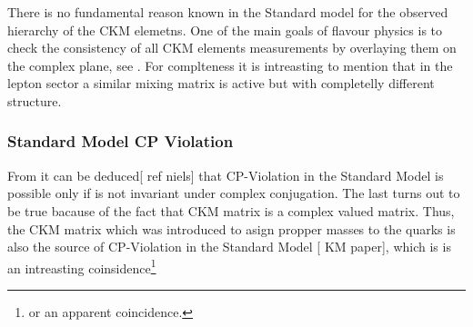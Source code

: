 There is no fundamental reason known in the Standard model for the observed hierarchy of the CKM elemetns.
One of the main goals of flavour physics is to check the consistency of all CKM elements measurements by overlaying them on the
complex plane, see . For complteness it is intreasting to mention that in the lepton sector a similar
mixing matrix is active but with completelly different structure.


\subsubsection{Standard Model CP Violation}
From  it can be deduced[{\color{red} ref niels}] that CP-Violation
in the Standard Model is possible only if  is not invariant under complex conjugation.
The last turns out to be true bacause of the fact that CKM matrix is a complex valued matrix.
Thus, the CKM matrix which was introduced to asign propper masses to the quarks is also the source of
CP-Violation in the Standard Model [{\color{red} KM paper}], which is is an intreasting coinsidence\footnote{or an apparent coincidence.}
